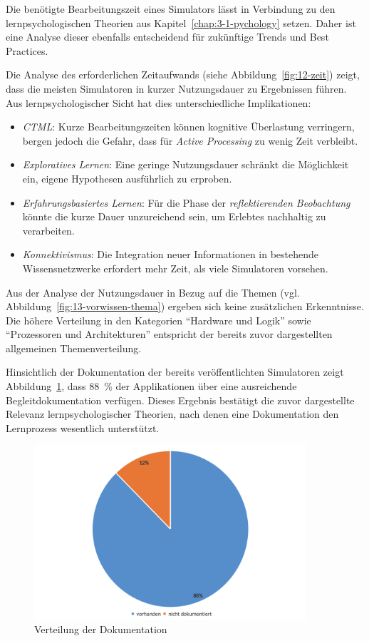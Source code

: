 Die benötigte Bearbeitungszeit eines Simulators lässt in Verbindung zu den lernpsychologischen Theorien aus Kapitel~\ref{chap:3-1-pychology} setzen. Daher ist eine Analyse dieser ebenfalls entscheidend für zukünftige Trends und Best Practices.

Die Analyse des erforderlichen Zeitaufwands (siehe Abbildung~\ref{fig:12-zeit}) zeigt, dass die meisten Simulatoren in kurzer Nutzungsdauer zu Ergebnissen führen. Aus lernpsychologischer Sicht hat dies unterschiedliche Implikationen:

\begin{itemize}
    \item \textit{\ac{CTML}}: Kurze Bearbeitungszeiten können kognitive Überlastung verringern, bergen jedoch die Gefahr, dass für \textit{Active Processing} zu wenig Zeit verbleibt.
    \item \textit{Exploratives Lernen}: Eine geringe Nutzungsdauer schränkt die Möglichkeit ein, eigene Hypothesen ausführlich zu erproben.
    \item \textit{Erfahrungsbasiertes Lernen}: Für die Phase der \textit{reflektierenden Beobachtung} könnte die kurze Dauer unzureichend sein, um Erlebtes nachhaltig zu verarbeiten.
    \item \textit{Konnektivismus}: Die Integration neuer Informationen in bestehende Wissensnetzwerke erfordert mehr Zeit, als viele Simulatoren vorsehen.
\end{itemize}

Aus der Analyse der Nutzungsdauer in Bezug auf die Themen (vgl. Abbildung~\ref{fig:13-vorwissen-thema}) ergeben sich keine zusätzlichen Erkenntnisse. Die höhere Verteilung in den Kategorien \enquote{Hardware und Logik} sowie \enquote{Prozessoren und Architekturen} entspricht der bereits zuvor dargestellten allgemeinen Themenverteilung.

Hinsichtlich der Dokumentation der bereits veröffentlichten Simulatoren zeigt Abbildung~\ref{fig:14-dokumentation}, dass 88~\% der Applikationen über eine ausreichende Begleitdokumentation verfügen. Dieses Ergebnis bestätigt die zuvor dargestellte Relevanz lernpsychologischer Theorien, nach denen eine Dokumentation den Lernprozess wesentlich unterstützt.

\begin{figure}[!htbp]
    \centering
    \includegraphics[width=0.90\textwidth]{graphics_sim/14-dokumentation.png}
    \caption{Verteilung der Dokumentation}
    \label{fig:14-dokumentation}
\end{figure}

